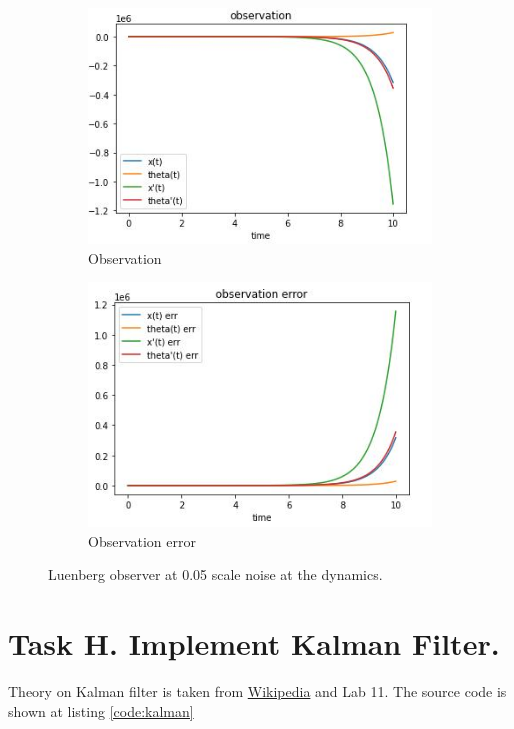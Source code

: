 \documentclass[12pt,letterpaper]{article}
\begin{document}
    \begin{figure}[htb]
        \begin{subfigure}{.5\textwidth}
            \centering
        \includegraphics[width=1\linewidth]{images/filter/luenberg_both.jpg}
        \caption{Observation}
        \end{subfigure}
        \begin{subfigure}{.5\textwidth}
          \centering
          \includegraphics[width=1\linewidth]{images/filter/luenberg_both_err.jpg}
          \caption{Observation error}
        \end{subfigure}
    \caption{Luenberg observer at 0.05 scale noise at the dynamics.}
    \label{fig:luenberg_noise}
    \end{figure}

\section*{Task H. Implement Kalman Filter.}
\label{Q:H}
    Theory on Kalman filter is taken from \href{https://en.wikipedia.org/wiki/Kalman_filter}{Wikipedia} and Lab 11. The source code is shown at listing \ref{code:kalman}
    
\end{document}
